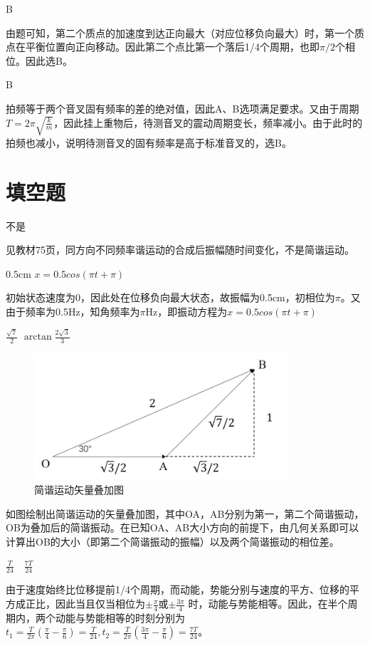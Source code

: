 \exercise B

\solve 
由题可知，第二个质点的加速度到达正向最大（对应位移负向最大）时，第一个质点在平衡位置向正向移动。因此第二个点比第一个落后1/4个周期，也即$\pi/2$个相位。因此选B。

\exercise B

\solve
拍频等于两个音叉固有频率的差的绝对值，因此A、B选项满足要求。又由于周期$T=2\pi\sqrt{\frac{k}{m}}$，因此挂上重物后，待测音叉的震动周期变长，频率减小。由于此时的拍频也减小，说明待测音叉的固有频率是高于标准音叉的，选B。

\section{填空题}
\exercise 不是

\solve 
见教材75页，同方向不同频率谐运动的合成后振幅随时间变化，不是简谐运动。

\exercise $0.5\mathrm{cm}$ \quad $x=0.5cos(\pi t+\pi)$

\solve
初始状态速度为0，因此处在位移负向最大状态，故振幅为0.5cm，初相位为$\pi$。又由于频率为0.5Hz，知角频率为$\pi$Hz，即振动方程为$x=0.5cos(\pi t+\pi)$
 
\exercise $\frac{\sqrt{7}}{2}$ \quad $\arctan{\frac{2\sqrt{3}}{3}}$

\solve
\begin{figure}[htbp]
\centering
\includegraphics[height=4.7cm,width=9.5cm]{./pics/Chp13_13.jpg}
\caption{简谐运动矢量叠加图}
\end{figure}
如图绘制出简谐运动的矢量叠加图，其中OA，AB分别为第一，第二个简谐振动，OB为叠加后的简谐振动。在已知OA、AB大小方向的前提下，由几何关系即可以计算出OB的大小（即第二个简谐振动的振幅）以及两个简谐振动的相位差。

\exercise $\frac{T}{24} \quad \frac{7T}{24}$

\solve
由于速度始终比位移提前1/4个周期，而动能，势能分别与速度的平方、位移的平方成正比，因此当且仅当相位为$\pm\frac{\pi}{4}$或$\pm\frac{3\pi}{4}$ 时，动能与势能相等。因此，在半个周期内，两个动能与势能相等的时刻分别为$t_1=\frac{T}{2\pi}\left(\frac{\pi}{4}-\frac{\pi}{6}\right)=\frac{T}{24}, t_2=\frac{T}{2\pi}\left(\frac{3\pi}{4}-\frac{\pi}{6}\right)=\frac{7T}{24}$。

